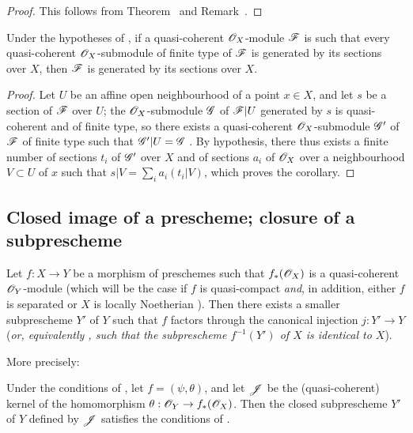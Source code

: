 \begin{proof}
This follows from Theorem~ and Remark~.
\end{proof}

\begin{corollary}[9.4.10]
\label{I.9.4.10}
Under the hypotheses of , if a quasi-coherent $\mathscr{O}_X$-module $\mathscr{F}$ is
such that every quasi-coherent $\mathscr{O}_X$-submodule of finite type of $\mathscr{F}$ is generated by
its sections over $X$, then $\mathscr{F}$ is generated by its sections over $X$.
\end{corollary}

\begin{proof}
Let $U$ be an affine open neighbourhood of a point $x\in X$, and let $s$ be a
section of $\mathscr{F}$ over $U$; the $\mathscr{O}_X$-submodule $\mathscr{G}$ of $\mathscr{F}|U$ generated by $s$
is quasi-coherent and of finite type, so there exists a quasi-coherent $\mathscr{O}_X$-submodule
$\mathscr{G}'$ of $\mathscr{F}$ of finite type such that $\mathscr{G}'|U=\mathscr{G}$ . By
hypothesis, there thus exists a finite number of sections $t_i$ of $\mathscr{G}'$ over $X$ and of
sections $a_i$ of $\mathscr{O}_X$ over a neighbourhood $V\subset U$ of $x$ such that
$s|V=\sum_i a_i(t_i|V)$, which proves the corollary.
\end{proof}

\subsection{Closed image of a prescheme; closure of a subprescheme}
\label{subsection:I.9.5}

\begin{proposition}[9.5.1]
\label{I.9.5.1}
Let $f:X\to Y$ be a morphism of preschemes such that $f_*(\mathscr{O}_X)$ is a quasi-coherent
$\mathscr{O}_Y$-module (which will be the case if $f$ is quasi-compact \emph{and}, in addition, either $f$ is separated or $X$ is locally Noetherian ). Then there exists a smaller
subprescheme $Y'$ of $Y$ such that $f$ factors through the canonical injection $j:Y'\to Y$
(\emph{or, equivalently , such that the subprescheme $f^{-1}(Y')$ of $X$ is
\emph{identical} to $X$}).
\end{proposition}

More precisely:
\begin{corollary}[9.5.2]
\label{I.9.5.2}
Under the conditions of , let $f=(\psi,\theta)$, and let $\mathscr{J}$ be the
(quasi-coherent) kernel of the homomorphism $\theta:\sh{O}_Y\to f_*(\sh{O}_X)$. Then the closed
subprescheme $Y'$ of $Y$ defined by $\mathscr{J}$ satisfies the conditions of .
\end{corollary}

